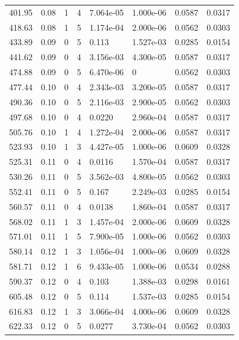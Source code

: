 \documentclass[preview]{standalone}
\begin{document}
{{{\begin{tabular}{L{1.2cm}C{1.2cm} C{0.3cm}C{0.5cm} C{1.4cm}C{1.4cm} C{1.4cm}C{1.4cm}}
  401.95  &  0.08  & 1     &  4 &  7.064e-05  & 1.000e-06  & 0.0587 &  0.0317   \\ 
  418.63  &  0.08  & 1     &  5 &  1.174e-04  & 2.000e-06  & 0.0562 &  0.0303   \\ 
  433.89  &  0.09  & 0     &  5 &  0.113  & 1.527e-03  & 0.0285 &  0.0154   \\ 
  441.62  &  0.09  & 0     &  4 &  3.156e-03  & 4.300e-05  & 0.0587 &  0.0317   \\ 
  474.88  &  0.09  & 0     &  5 &  6.470e-06  & 0  & 0.0562 &  0.0303   \\ 
  477.44  &  0.10  & 0     &  4 &  2.343e-03  & 3.200e-05  & 0.0587 &  0.0317   \\ 
  490.36  &  0.10  & 0     &  5 &  2.116e-03  & 2.900e-05  & 0.0562 &  0.0303   \\ 
  497.68  &  0.10  & 0     &  4 &  0.0220  & 2.960e-04  & 0.0587 &  0.0317   \\ 
  505.76  &  0.10  & 1     &  4 &  1.272e-04  & 2.000e-06  & 0.0587 &  0.0317   \\ 
  523.93  &  0.10  & 1     &  3 &  4.427e-05  & 1.000e-06  & 0.0609 &  0.0328   \\ 
  525.31  &  0.11  & 0     &  4 &  0.0116  & 1.570e-04  & 0.0587 &  0.0317   \\ 
  530.26  &  0.11  & 0     &  5 &  3.562e-03  & 4.800e-05  & 0.0562 &  0.0303   \\ 
  552.41  &  0.11  & 0     &  5 &  0.167  & 2.249e-03  & 0.0285 &  0.0154   \\ 
  560.57  &  0.11  & 0     &  4 &  0.0138  & 1.860e-04  & 0.0587 &  0.0317   \\ 
  568.02  &  0.11  & 1     &  3 &  1.457e-04  & 2.000e-06  & 0.0609 &  0.0328   \\ 
  571.01  &  0.11  & 1     &  5 &  7.900e-05  & 1.000e-06  & 0.0562 &  0.0303   \\ 
  580.14  &  0.12  & 1     &  3 &  1.056e-04  & 1.000e-06  & 0.0609 &  0.0328   \\ 
  581.71  &  0.12  & 1     &  6 &  9.433e-05  & 1.000e-06  & 0.0534 &  0.0288   \\ 
  590.37  &  0.12  & 0     &  4 &  0.103  & 1.388e-03  & 0.0298 &  0.0161   \\ 
  605.48  &  0.12  & 0     &  5 &  0.114  & 1.537e-03  & 0.0285 &  0.0154   \\ 
  616.83  &  0.12  & 1     &  3 &  3.066e-04  & 4.000e-06  & 0.0609 &  0.0328   \\ 
  622.33  &  0.12  & 0     &  5 &  0.0277  & 3.730e-04  & 0.0562 &  0.0303   \\ 

\end{tabular}}}}
\end{document}
